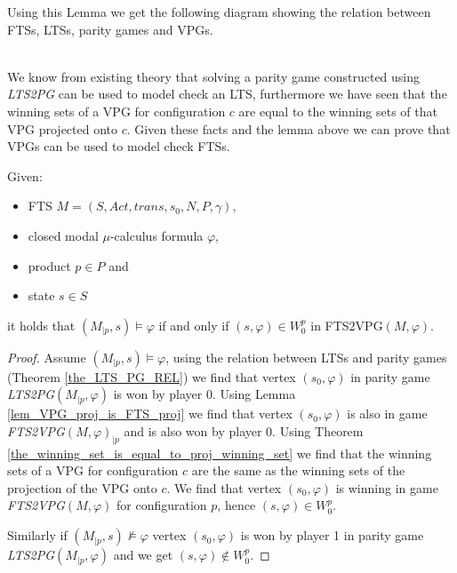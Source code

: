 Using this Lemma we get the following diagram showing the relation between FTSs, LTSs, parity games and VPGs.\\
\\
We know from existing theory that solving a parity game constructed using \textit{LTS2PG} can be used to model check an LTS, furthermore we have seen that the winning sets of a VPG for configuration $c$ are equal to the winning sets of that VPG projected onto $c$. Given these facts and the lemma above we can prove that VPGs can be used to model check FTSs.
\begin{theorem}
	\label{the_FTS2VPG_is_correct} Given:
	\begin{itemize}
		\item FTS $M = (S,Act,trans,s_0,N,P,\gamma)$,
		\item closed modal $\mu$-calculus formula $\varphi$,
		\item product $p \in P$ and
		\item state $s \in S$
	\end{itemize}
it holds that $(M_{|p},s) \models \varphi$ if and only if $(s,\varphi) \in W_0^p$ in FTS2VPG$(M,\varphi)$.
\begin{proof}
	Assume $(M_{|p},s) \models \varphi$, using the relation between LTSs and parity games (Theorem \ref{the_LTS_PG_REL}) we find that vertex $(s_0,\varphi)$ in parity game \textit{LTS2PG}$(M_{|p},\varphi)$ is won by player 0. Using Lemma \ref{lem_VPG_proj_is_FTS_proj} we find that vertex $(s_0,\varphi)$ is also in game \textit{FTS2VPG}$(M,\varphi)_{|p}$ and is also won by player 0. Using Theorem \ref{the_winning_set_is_equal_to_proj_winning_set} we find that the winning sets of a VPG for configuration $c$ are the same as the winning sets of the projection of the VPG onto $c$. We find that vertex $(s_0,\varphi)$ is winning in game \textit{FTS2VPG}$(M,\varphi)$ for configuration $p$, hence $(s,\varphi) \in W_0^p$.
	
	Similarly if $(M_{|p},s) \not\models \varphi$ vertex $(s_0,\varphi)$ is won by player 1 in parity game \textit{LTS2PG}$(M_{|p},\varphi)$ and we get $(s,\varphi) \notin W_0^p$.
\end{proof}
\end{theorem}

